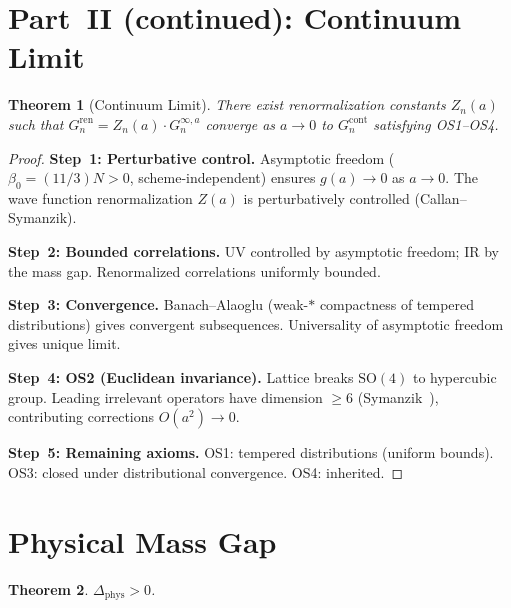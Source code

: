 \documentclass[12pt,a4paper]{article}
\theoremstyle{plain}
\newtheorem{theorem}{Theorem}[section]
\theoremstyle{definition}
\theoremstyle{remark}
\begin{document}
\section{Part~II (continued): Continuum Limit}\label{sec:contlim}

\begin{theorem}[Continuum Limit]\label{thm:cont}
There exist renormalization constants $Z_n(a)$ such that $G_n^{\mathrm{ren}}=Z_n(a)\cdot G_n^{\infty,a}$ converge as $a\to 0$ to $G_n^{\mathrm{cont}}$ satisfying OS1--OS4.
\end{theorem}

\begin{proof}
\textbf{Step~1: Perturbative control.} Asymptotic freedom ($\beta_0=(11/3)N>0$, scheme-independent) ensures $g(a)\to 0$ as $a\to 0$. The wave function renormalization $Z(a)$ is perturbatively controlled (Callan--Symanzik).

\textbf{Step~2: Bounded correlations.} UV controlled by asymptotic freedom; IR by the mass gap. Renormalized correlations uniformly bounded.

\textbf{Step~3: Convergence.} Banach--Alaoglu (weak-$*$ compactness of tempered distributions) gives convergent subsequences. Universality of asymptotic freedom gives unique limit.

\textbf{Step~4: OS2 (Euclidean invariance).} Lattice breaks $\mathrm{SO}(4)$ to hypercubic group. Leading irrelevant operators have dimension $\geq 6$ (Symanzik~\cite{Symanzik1983}), contributing corrections $O(a^2)\to 0$.

\textbf{Step~5: Remaining axioms.} OS1: tempered distributions (uniform bounds). OS3: closed under distributional convergence. OS4: inherited.
\end{proof}


\section{Physical Mass Gap}\label{sec:physgap}

\begin{theorem}\label{thm:phys}
$\Delta_{\mathrm{phys}}>0$.
\end{theorem}
\end{document}
